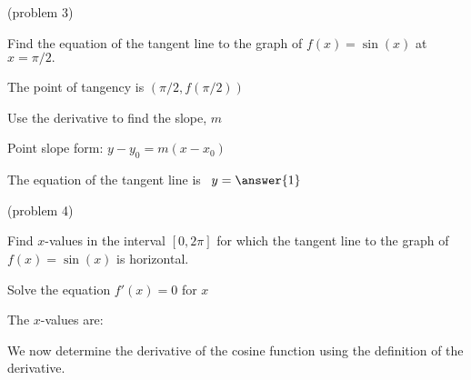 \documentclass[handout]{ximera}
\begin{document}
\begin{problem}(problem 3)

Find the equation of the tangent line to the graph of $f(x) = \sin(x)$ at $x=\pi/2.$

\begin{hint}
The point of tangency is $(\pi/2, f(\pi/2))$
\end{hint}
\begin{hint}
Use the derivative to find the slope, $m$
\end{hint}
\begin{hint}
Point slope form: $y-y_0 = m(x-x_0)$
\end{hint}

The equation of the tangent line is \ $y = \answer{1}$

\end{problem}



\begin{problem}(problem 4)

Find $x$-values in the interval $[0, 2\pi]$ for which the tangent line to the graph of $f(x) = \sin(x)$ is horizontal.


\begin{hint}
Solve the equation $f'(x) = 0$ for $x$
\end{hint}

The $x$-values are:
\begin{multipleChoice}
\end{multipleChoice}

\end{problem}







We now determine the derivative of the cosine function using the definition of the derivative.
\end{document}
